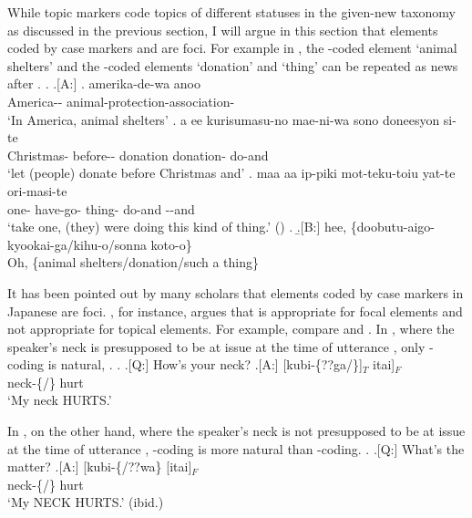While topic markers code topics of different statuses in the given-new taxonomy as discussed in the previous section,
I will argue in this section that
elements coded by case markers  and  are foci.
For example in \Next,
the -coded element  `animal shelters' and
the -coded elements  `donation' and  `thing'
can be repeated as news after .
%
\ex.
 \a.[A:]
 \ag. amerika-de-wa anoo  \\
   America--  animal-protection-association- \\
   `In America, animal shelters'
  \bg. a ee kurisumasu-no mae-ni-wa sono doneesyon  si-te \\
     Christmas- before--  donation donation- do-and \\
   `let (people) donate before Christmas and'
  \bg. maa aa ip-piki mot-teku-toiu  yat-te ori-masi-te \\
     one- have-go- thing- do-and --and \\
   `take one, (they) were doing this kind of thing.'
   \hfill{()}
  \z.
  \b.[B:] hee, \{doobutu-aigo-kyookai-ga/kihu-o/sonna koto-o\} \\
   Oh, \{animal shelters/donation/such a thing\}
%

It has been pointed out by many scholars that
elements coded by case markers in Japanese are foci.
, for instance, argues that  is appropriate for focal elements
and not appropriate for topical elements.
For example,
compare \Next and \NNext.
In \Next,
where the speaker's neck is presupposed to be at issue at the time of utterance \Next[A],
only -coding is natural,
.
%
\ex. \a.[Q:] How's your neck?
	\bg.[A:] [kubi-\{??ga/\}]$_{T}$ itai]$_{F}$ \\
			neck-\{/\} hurt \\
			`My neck HURTS.' \hfill{}

In \Next,
on the other hand,
where the speaker's neck is not presupposed to be at issue at the time of utterance \Next[A],
-coding is more natural than -coding.
\ex. \a.[Q:] What's the matter?
	\bg.[A:] [kubi-\{/??wa\} [itai]$_{F}$ \\
			neck-\{/\} hurt \\
			`My NECK HURTS.' \hfill{(ibid.)}


